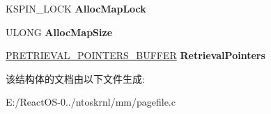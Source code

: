 \begin{DoxyCompactItemize}
\mbox{\label{struct___p_a_g_i_n_g_f_i_l_e_a7c852c7808ddc9310dea05f038c0d015}} 
K\+S\+P\+I\+N\+\_\+\+L\+O\+CK {\bfseries Alloc\+Map\+Lock}
\item 
\mbox{\label{struct___p_a_g_i_n_g_f_i_l_e_a9bf3e76ba8b69cefa37f2cad858c83fb}} 
U\+L\+O\+NG {\bfseries Alloc\+Map\+Size}
\item 
\mbox{\label{struct___p_a_g_i_n_g_f_i_l_e_a3f1a08c2c5248f4eed21677ac4d4d82c}} 
\hyperlink{struct_r_e_t_r_i_e_v_a_l___p_o_i_n_t_e_r_s___b_u_f_f_e_r}{P\+R\+E\+T\+R\+I\+E\+V\+A\+L\+\_\+\+P\+O\+I\+N\+T\+E\+R\+S\+\_\+\+B\+U\+F\+F\+ER} {\bfseries Retrieval\+Pointers}
\end{DoxyCompactItemize}


该结构体的文档由以下文件生成\+:\begin{DoxyCompactItemize}
\item 
E\+:/\+React\+O\+S-\/0../ntoskrnl/mm/pagefile.\+c\end{DoxyCompactItemize}
